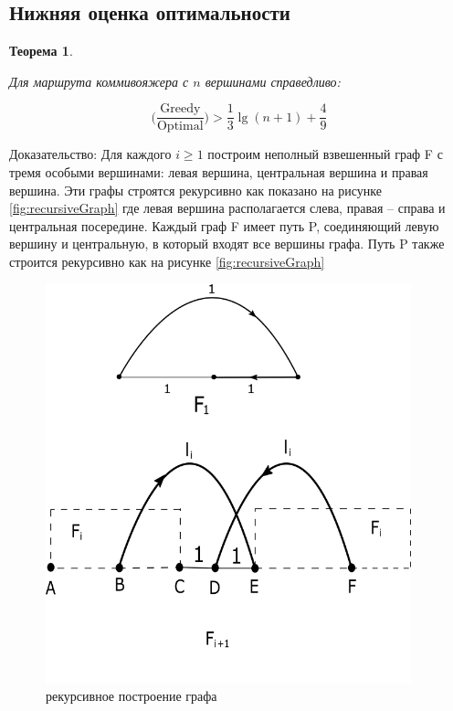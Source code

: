 \documentclass[a4paper, 14pt]{extarticle}
\numberwithin{equation}{section}
\newtheorem{theorem}{Теорема}[section]
\begin{document}
\subsection{Нижняя оценка оптимальности}

\begin{theorem}
\label{theoremtwometric}

Для маршрута коммивояжера с $n$ вершинами справедливо:

\begin{equation*}
	\Big(\frac{\mathrm{Greedy}}{\mathrm{Optimal}}\Big) > \frac{1}{3}{\lg (n+1)} + \frac{4}{9}
\end{equation*}

\end{theorem}

Доказательство:  Для каждого $i \geqslant 1 $ построим неполный взвешенный граф F с тремя особыми вершинами: левая вершина, центральная вершина и правая вершина. Эти графы строятся рекурсивно как показано на рисунке \eqref{fig:recursiveGraph} где левая вершина располагается слева, правая -- справа и центральная посередине. Каждый граф F имеет путь P, соединяющий левую вершину и центральную, в который входят все вершины графа. Путь P также строится рекурсивно как на рисунке \eqref{fig:recursiveGraph} 

\begin{figure}[h!]
\begin{center}
\includegraphics[width=300pt]{ris1.png}
\caption{рекурсивное построение графа}
\label{fig:recursiveGraph}
\end{center}
\end{figure}
\end{document}
